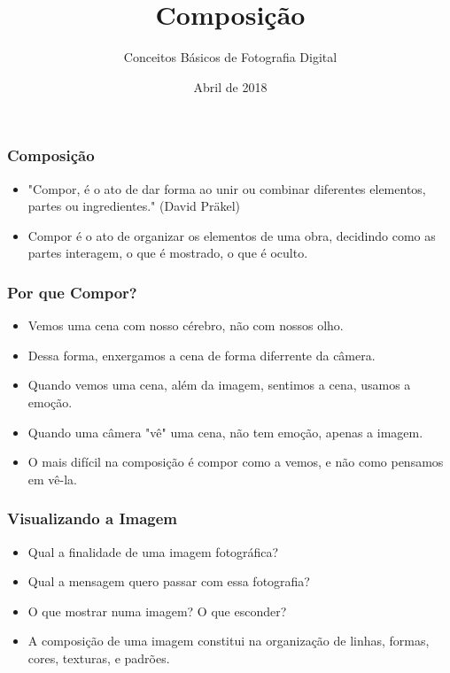 


\subtitle{Conceitos Básicos de Fotografia Digital}
\title{Composição}
\author{}
\date{Abril de 2018}



\coverframe

\begin{frame}
    \frametitle{Composição}
    \begin{itemize}
      \item "Compor, é o ato de dar forma ao unir ou combinar diferentes elementos,
      partes ou ingredientes." (David Präkel)
      \item Compor é o ato de organizar os elementos de uma obra, decidindo como
      as partes interagem, o que é mostrado, o que é oculto.
    \end{itemize}
\end{frame}

\begin{frame}
    \frametitle{Por que Compor?}
    \begin{itemize}
      \item Vemos uma cena com nosso cérebro, não com nossos olho.
      \item Dessa forma, enxergamos a cena de forma diferrente da câmera.
      \item Quando vemos uma cena, além da imagem, sentimos a cena, usamos a emoção.
      \item Quando uma câmera "vê" uma cena, não tem emoção, apenas a imagem.
      \item O mais difícil na composição é compor como a vemos, e não como pensamos em vê-la.
    \end{itemize}
\end{frame}

\begin{frame}
    \frametitle{Visualizando a Imagem}
    \begin{itemize}
      \item Qual a finalidade de uma imagem fotográfica?
      \item Qual a mensagem quero passar com essa fotografia?
      \item O que mostrar numa imagem? O que esconder?
      \item A composição de uma imagem constitui na organização de linhas, formas,
      cores, texturas, e padrões.
    \end{itemize}
\end{frame}

